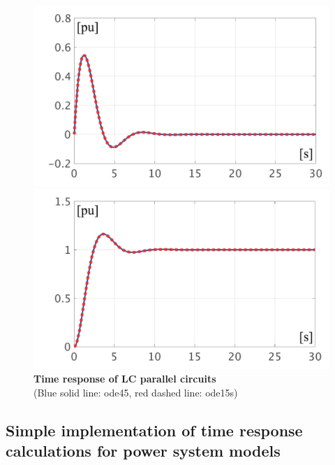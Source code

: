 \documentclass[graybox, envcountchap]{svmult}
\begin{document}
\begin{example}
\begin{figure}[t]
  \centering
  {
    \begin{minipage}{0.49\linewidth}
      \centering
      \includegraphics[width = 1.0\linewidth]{figs/iL}
    \end{minipage}
    \begin{minipage}{0.49\linewidth}
      \centering
      \includegraphics[width = 1.0\linewidth]{figs/vC}
    \end{minipage}
    \medskip
    \caption{\textbf{Time response of LC parallel circuits}
      \\ \centering(Blue solid line: ode45, red dashed line: ode15s)}
    \label{fig:solution_dae}
  }
  \medskip
\end{figure}
\end{example}

\subsection{Simple implementation of time response calculations for power system
models}
\end{document}
